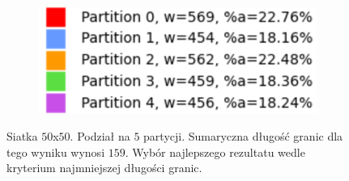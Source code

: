 \begin{figure}[h]
\centering
\begin{subfigure}{.33\textwidth}
    \centering
    \caption[short]{}
\end{subfigure}%
\begin{subfigure}{.33\textwidth}
    \centering
    \caption[short]{}
\end{subfigure}%
\begin{subfigure}{.33\textwidth}
    \centering
    \includegraphics[width=0.9\linewidth]{images/results/m_k/with/10/results}
    \caption[short]{}
\end{subfigure}
\caption{Siatka $50$x$50$. Podział na $5$ partycji. Sumaryczna długość granic dla tego wyniku wynosi $159$.
Wybór najlepszego rezultatu wedle kryterium najmniejszej długości granic.}
\label{result:10}
\end{figure}

